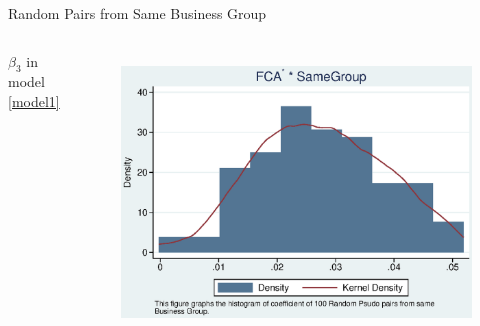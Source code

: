 \documentclass{beamer}
\begin{document}
	
	\begin{frame}{Random Pairs from Same Business Group}
		
		\begin{columns}\centering
			\begin{center}
				$ \beta_3 $ in model \ref{model1}
			\end{center}
			
			\begin{figure}
				\centering
				\includegraphics[width=\linewidth]{BusinessPseudoSBFCA.eps}\\
				

\end{figure}
\end{columns}
\end{frame}
\end{document}
